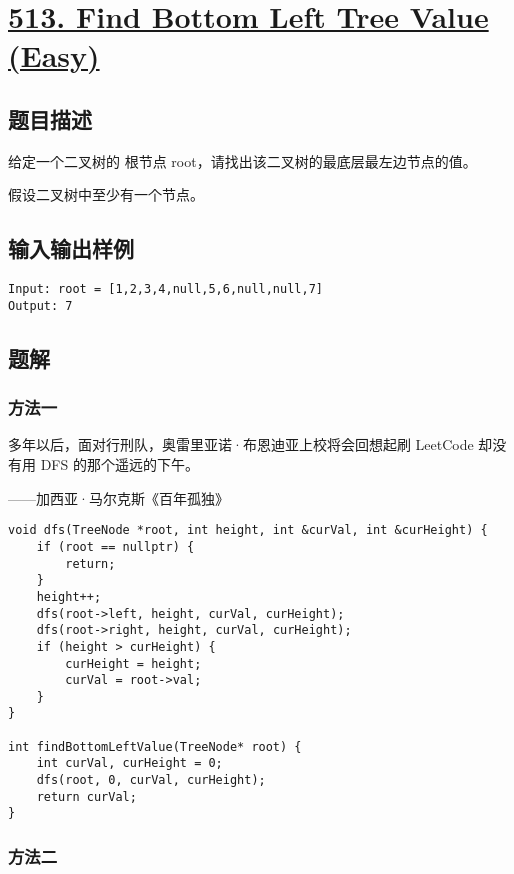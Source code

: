 \documentclass[lang=cn,10pt]{elegantbook}
\begin{document}
{\color{red}\section{\href{https://leetcode.cn/problems/find-bottom-left-tree-value/}{513. Find Bottom Left Tree Value (Easy)}}} \label{ch14.513}

\subsection*{题目描述}

给定一个二叉树的 根节点 root，请找出该二叉树的最底层最左边节点的值。

假设二叉树中至少有一个节点。

\subsection*{输入输出样例}

\begin{lstlisting}
Input: root = [1,2,3,4,null,5,6,null,null,7]
Output: 7
\end{lstlisting}

\subsection*{题解}

\subsubsection*{方法一}

多年以后，面对行刑队，奥雷里亚诺·布恩迪亚上校将会回想起刷 LeetCode 却没有用 DFS 的那个遥远的下午。

——加西亚·马尔克斯《百年孤独》

\begin{lstlisting}
void dfs(TreeNode *root, int height, int &curVal, int &curHeight) {
	if (root == nullptr) {
		return;
	}
	height++;
	dfs(root->left, height, curVal, curHeight);
	dfs(root->right, height, curVal, curHeight);
	if (height > curHeight) {
		curHeight = height;
		curVal = root->val;
	}
}

int findBottomLeftValue(TreeNode* root) {
	int curVal, curHeight = 0;
	dfs(root, 0, curVal, curHeight);
	return curVal;
}
\end{lstlisting}

\subsubsection*{方法二}
\end{document}
